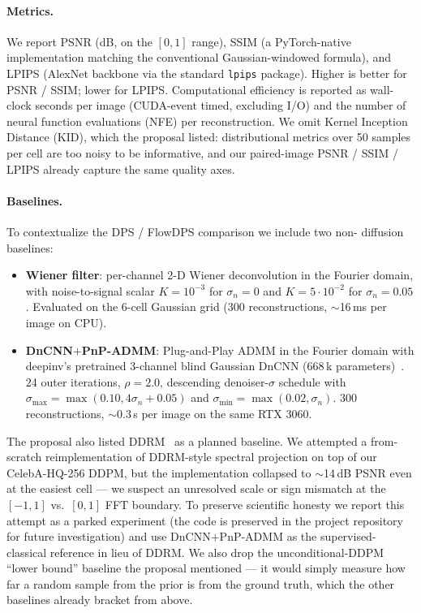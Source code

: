 \documentclass{article}
\begin{document}
\paragraph{Metrics.}
We report PSNR (dB, on the $[0, 1]$ range), SSIM (a PyTorch-native
implementation matching the conventional Gaussian-windowed formula),
and LPIPS (AlexNet backbone via the standard \texttt{lpips} package).
Higher is better for PSNR / SSIM; lower for LPIPS. Computational
efficiency is reported as wall-clock seconds per image (CUDA-event
timed, excluding I/O) and the number of neural function evaluations
(NFE) per reconstruction. We omit Kernel Inception Distance (KID),
which the proposal listed: distributional metrics over 50 samples per
cell are too noisy to be informative, and our paired-image PSNR / SSIM
/ LPIPS already capture the same quality axes.

\paragraph{Baselines.}
To contextualize the DPS / FlowDPS comparison we include two non-
diffusion baselines:
\begin{itemize}[leftmargin=*,itemsep=2pt]
  \item \textbf{Wiener filter}: per-channel 2-D Wiener deconvolution
    in the Fourier domain, with noise-to-signal scalar $K = 10^{-3}$
    for $\sigma_n = 0$ and $K = 5 \cdot 10^{-2}$ for $\sigma_n = 0.05$.
    Evaluated on the 6-cell Gaussian grid (300 reconstructions,
    $\sim$16\,ms per image on CPU).
  \item \textbf{DnCNN$+$PnP-ADMM}: Plug-and-Play ADMM in the Fourier
    domain with deepinv's pretrained 3-channel blind Gaussian DnCNN
    (668\,k parameters)~\cite{zhang2017dncnn,chan2017pnp}. 24 outer
    iterations, $\rho = 2.0$, descending denoiser-$\sigma$ schedule
    with $\sigma_\text{max} = \max(0.10, 4\sigma_n + 0.05)$ and
    $\sigma_\text{min} = \max(0.02, \sigma_n)$. 300 reconstructions,
    $\sim$0.3\,s per image on the same RTX 3060.
\end{itemize}

The proposal also listed DDRM~\cite{kawar2022ddrm} as a planned
baseline. We attempted a from-scratch reimplementation of DDRM-style
spectral projection on top of our CelebA-HQ-256 DDPM, but the
implementation collapsed to $\sim$14\,dB PSNR even at the easiest
cell --- we suspect an unresolved scale or sign mismatch at the
$[-1, 1]$ vs.\ $[0, 1]$ FFT boundary. To preserve scientific honesty
we report this attempt as a parked experiment (the code is preserved
in the project repository for future investigation) and use
DnCNN$+$PnP-ADMM as the supervised-classical reference in lieu of
DDRM. We also drop the unconditional-DDPM ``lower bound'' baseline
the proposal mentioned --- it would simply measure how far a random
sample from the prior is from the ground truth, which the other
baselines already bracket from above.
\end{document}
